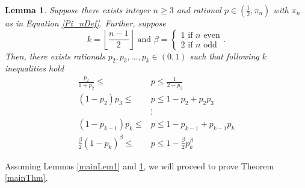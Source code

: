 \documentclass[11pt]{article}
\newtheorem{lemma}[theorem]{Lemma}
\theoremstyle{definition}
\begin{document}
\begin{lemma}\label{RationalExistenceLem}
    Suppose there exists integer $n \geq 3$ and rational $p \in \left( \frac{1}{2}, \pi_n\right)$ with $\pi_n$ as in Equation \ref{Pi_nDef}. Further, suppose
    $$k = \left\lfloor \frac{n-1}{2} \right\rfloor \text{ and } \beta = \begin{cases} 1 \text{ if } n \text{ even} \\ 2 \text{ if } n \text{ odd} \end{cases}.$$
    Then, there exists rationals $p_2,p_3,\dots,p_k \in (0,1)$ such that following $k$ inequalities hold
    \begin{equation}\label{probIneqs}
    \begin{split}
        \frac{p_2}{1+p_2} \leq &p \leq \frac{1}{2-p_2} \\
        (1-p_2)p_3 \leq &p \leq 1-p_2+p_2p_3 \\
        &\vdots \\
        (1-p_{k-1})p_{k} \leq &p \leq 1-p_{k-1}+p_{k-1}p_{k} \\
        \frac{\beta}{2}(1-p_k)^\beta \leq &p \leq 1-\frac{\beta}{2}p_k^\beta
    \end{split}
    \end{equation}
\end{lemma}


Assuming Lemmas \ref{mainLem1} and \ref{RationalExistenceLem}, we will proceed to prove Theorem \ref{mainThm}.
\end{document}
